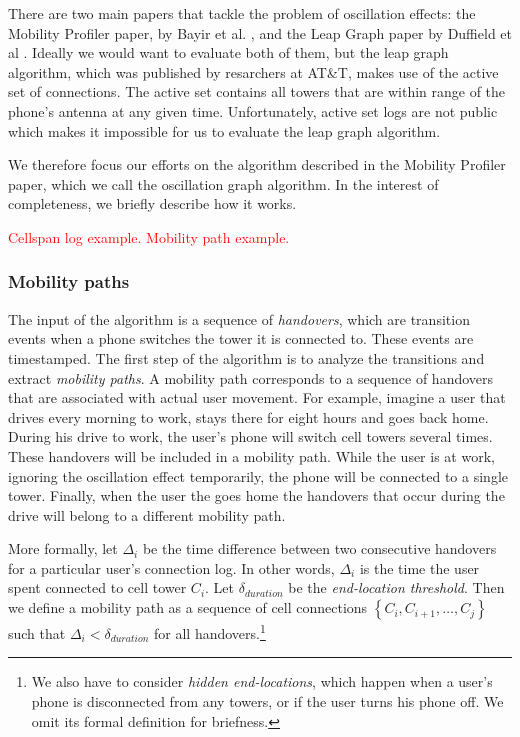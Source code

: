 \documentclass[letterpaper, 11pt, conference]{ieeeconf}
\newcommand{\xxx}[1]{\textcolor{red}{#1}}
\begin{document}
There are two main papers that tackle the problem of oscillation effects: the Mobility Profiler paper, by Bayir et al. \cite{mobilityprofiler}, and the Leap Graph paper by Duffield et al \cite{LeapGraph}. Ideally we would want to evaluate both of them, but the leap graph algorithm, which was published by resarchers at AT\&T, makes use of the active set of connections. The active set contains all towers that are within range of the phone's antenna at any given time. Unfortunately, active set logs are not public which makes it impossible for us to evaluate the leap graph algorithm.

We therefore focus our efforts on the algorithm described in the Mobility Profiler paper, which we call the oscillation graph algorithm. In the interest of completeness, we briefly describe how it works.

\xxx{Cellspan log example. Mobility path example.}

\subsubsection{Mobility paths}
The input of the algorithm is a sequence of \textit{handovers}, which are transition events when a phone switches the tower it is connected to. These events are timestamped. The first step of the algorithm is to analyze the transitions and extract \textit{mobility paths}.  A mobility path corresponds to a sequence of handovers that are associated with actual user movement. For example, imagine a user that drives every morning to work, stays there for eight hours and goes back home. During his drive to work, the user's phone will switch cell towers several times. These handovers will be included in a mobility path. While the user is at work, ignoring the oscillation effect temporarily, the phone will be connected to a single tower. Finally, when the user the goes home the handovers that occur during the drive will belong to a different mobility path.

More formally, let $\Delta_i$ be the time difference between two consecutive handovers for a particular user's connection log. In other words, $\Delta_i$ is the time the user spent connected to cell tower $C_i$. Let $\delta_{duration}$ be the \textit{end-location threshold}. Then we define a mobility path as a sequence of cell connections $\left\{C_i, C_{i+1}, \ldots, C_j\right\}$ such that $\Delta_i < \delta_{duration}$ for all handovers.\footnote{We also have to consider \textit{hidden end-locations}, which happen when a user's phone is disconnected from any towers, or if the user turns his phone off. We omit its formal definition for briefness.}
\end{document}

